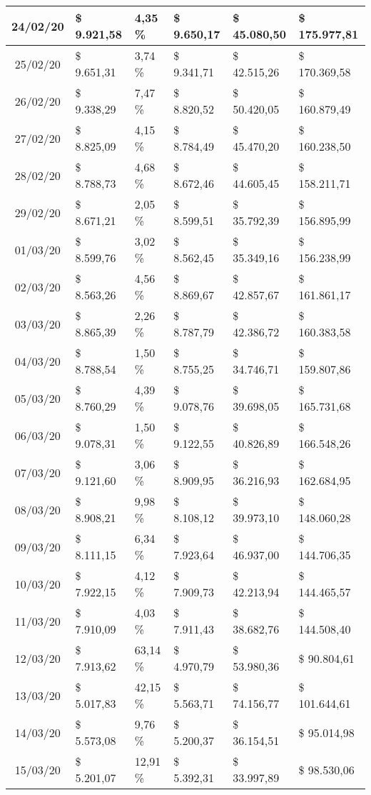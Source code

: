 \begin{small}
\begin{longtable}{|c|l|l|l|l|l|}
24/02/20 & \$ 9.921,58 & 4,35 \% & \$ 9.650,17 & \$ 45.080,50 & \$ 175.977,81 \\ \hline
25/02/20 & \$ 9.651,31 & 3,74 \% & \$ 9.341,71 & \$ 42.515,26 & \$ 170.369,58 \\ \hline
26/02/20 & \$ 9.338,29 & 7,47 \% & \$ 8.820,52 & \$ 50.420,05 & \$ 160.879,49 \\ \hline
27/02/20 & \$ 8.825,09 & 4,15 \% & \$ 8.784,49 & \$ 45.470,20 & \$ 160.238,50 \\ \hline
28/02/20 & \$ 8.788,73 & 4,68 \% & \$ 8.672,46 & \$ 44.605,45 & \$ 158.211,71 \\ \hline
29/02/20 & \$ 8.671,21 & 2,05 \% & \$ 8.599,51 & \$ 35.792,39 & \$ 156.895,99 \\ \hline
01/03/20 & \$ 8.599,76 & 3,02 \% & \$ 8.562,45 & \$ 35.349,16 & \$ 156.238,99 \\ \hline
02/03/20 & \$ 8.563,26 & 4,56 \% & \$ 8.869,67 & \$ 42.857,67 & \$ 161.861,17 \\ \hline
03/03/20 & \$ 8.865,39 & 2,26 \% & \$ 8.787,79 & \$ 42.386,72 & \$ 160.383,58 \\ \hline
04/03/20 & \$ 8.788,54 & 1,50 \% & \$ 8.755,25 & \$ 34.746,71 & \$ 159.807,86 \\ \hline
05/03/20 & \$ 8.760,29 & 4,39 \% & \$ 9.078,76 & \$ 39.698,05 & \$ 165.731,68 \\ \hline
06/03/20 & \$ 9.078,31 & 1,50 \% & \$ 9.122,55 & \$ 40.826,89 & \$ 166.548,26 \\ \hline
07/03/20 & \$ 9.121,60 & 3,06 \% & \$ 8.909,95 & \$ 36.216,93 & \$ 162.684,95 \\ \hline
08/03/20 & \$ 8.908,21 & 9,98 \% & \$ 8.108,12 & \$ 39.973,10 & \$ 148.060,28 \\ \hline
09/03/20 & \$ 8.111,15 & 6,34 \% & \$ 7.923,64 & \$ 46.937,00 & \$ 144.706,35 \\ \hline
10/03/20 & \$ 7.922,15 & 4,12 \% & \$ 7.909,73 & \$ 42.213,94 & \$ 144.465,57 \\ \hline
11/03/20 & \$ 7.910,09 & 4,03 \% & \$ 7.911,43 & \$ 38.682,76 & \$ 144.508,40 \\ \hline
12/03/20 & \$ 7.913,62 & 63,14 \% & \$ 4.970,79 & \$ 53.980,36 & \$ 90.804,61 \\ \hline
13/03/20 & \$ 5.017,83 & 42,15 \% & \$ 5.563,71 & \$ 74.156,77 & \$ 101.644,61 \\ \hline
14/03/20 & \$ 5.573,08 & 9,76 \% & \$ 5.200,37 & \$ 36.154,51 & \$ 95.014,98 \\ \hline
15/03/20 & \$ 5.201,07 & 12,91 \% & \$ 5.392,31 & \$ 33.997,89 & \$ 98.530,06 \\ \hline

\end{longtable}
\end{small}
